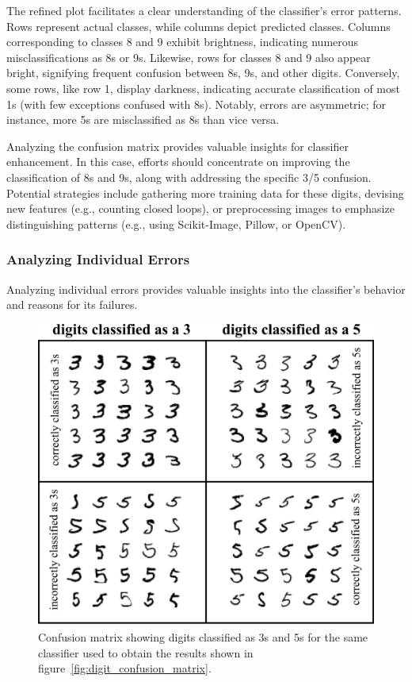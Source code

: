 \documentclass[12pt,letter]{article}
\begin{document}
The refined plot facilitates a clear understanding of the classifier's error patterns. Rows represent actual classes, while columns depict predicted classes. Columns corresponding to classes 8 and 9 exhibit brightness, indicating numerous misclassifications as 8s or 9s. Likewise, rows for classes 8 and 9 also appear bright, signifying frequent confusion between 8s, 9s, and other digits. Conversely, some rows, like row 1, display darkness, indicating accurate classification of most 1s (with few exceptions confused with 8s). Notably, errors are asymmetric; for instance, more 5s are misclassified as 8s than vice versa.

Analyzing the confusion matrix provides valuable insights for classifier enhancement. In this case, efforts should concentrate on improving the classification of 8s and 9s, along with addressing the specific 3/5 confusion. Potential strategies include gathering more training data for these digits, devising new features (e.g., counting closed loops), or preprocessing images to emphasize distinguishing patterns (e.g., using Scikit-Image, Pillow, or OpenCV).



\subsubsection{Analyzing Individual Errors}

Analyzing individual errors provides valuable insights into the classifier's behavior and reasons for its failures.

\begin{figure}[H]
    \centering
    \includegraphics[]{../figures/3s_and_5s.png}
    \caption{Confusion matrix showing digits classified as 3s and 5s for the same classifier used to obtain the results shown in figure~\ref{fig:digit_confusion_matrix}.}
    \label{fig:3s_and_5s}
\end{figure}
\end{document}
